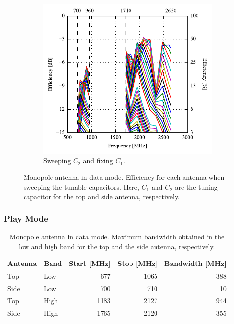 \begin{figure}[htbp]
\begin{subfigure}{0.49\linewidth}
        \includegraphics{img/tech_sol/monopole/highband/ue/datamode/eff_side.pdf}
        \caption{Sweeping $C_2$ and fixing $C_1$.}
    \end{subfigure}
    \caption{Monopole antenna in data mode. Efficiency for each antenna when sweeping the tunable capacitors. Here, $C_1$ and $C_2$ are the tuning capacitor for the top and side antenna, respectively.}
    \label{fig:eff_mono_modi_data_mode}
\end{figure}

\FloatBarrier
\subsubsection{Play Mode}

\begin{table}[htbp]
  \centering
  \begin{tabular}{|l|l|r|r|r|}
    \hline
    Antenna & Band & Start [MHz] & Stop [MHz] & Bandwidth [MHz] \\
    \hline
    Top     & Low  &  677  & 1065  & 388 \\
    Side    & Low  &  700  & 710  & 10  \\
    \hline
    Top     & High &  1183 &  2127  & 944 \\
    Side    & High & 1765 &  2120 & 355 \\
    \hline
  \end{tabular}
  \caption{Monopole antenna in data mode. Maximum bandwidth obtained in the low and high band for the top and the side antenna, respectively.}    
  \label{tab:bw_mono_modi_pm}
\end{table}

